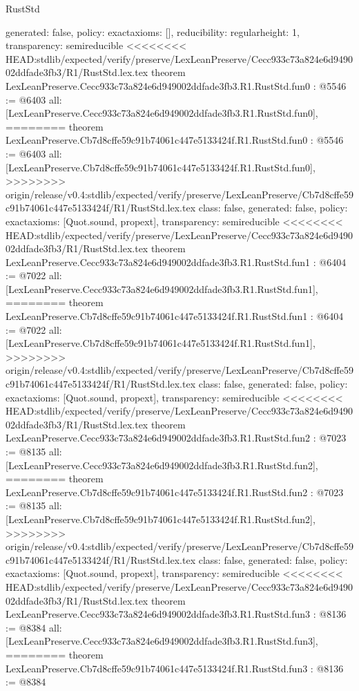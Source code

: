 \begin{lexlean}{RustStd}
\begin{coremodule}
{\begin{coremodule}
{{{  generated: false,
  policy: exact{axioms: []},
  reducibility: regular{height: 1},
  transparency: semireducible
}
<<<<<<<< HEAD:stdlib/expected/verify/preserve/LexLeanPreserve/Cecc933c73a824e6d949002ddfade3fb3/R1/RustStd.lex.tex
theorem LexLeanPreserve.Cecc933c73a824e6d949002ddfade3fb3.R1.RustStd.fun0 : @5546 := @6403 {
  all: [LexLeanPreserve.Cecc933c73a824e6d949002ddfade3fb3.R1.RustStd.fun0],
========
theorem LexLeanPreserve.Cb7d8cffe59c91b74061c447e5133424f.R1.RustStd.fun0 : @5546 := @6403 {
  all: [LexLeanPreserve.Cb7d8cffe59c91b74061c447e5133424f.R1.RustStd.fun0],
>>>>>>>> origin/release/v0.4:stdlib/expected/verify/preserve/LexLeanPreserve/Cb7d8cffe59c91b74061c447e5133424f/R1/RustStd.lex.tex
  class: false,
  generated: false,
  policy: exact{axioms: [Quot.sound, propext]},
  transparency: semireducible
}
<<<<<<<< HEAD:stdlib/expected/verify/preserve/LexLeanPreserve/Cecc933c73a824e6d949002ddfade3fb3/R1/RustStd.lex.tex
theorem LexLeanPreserve.Cecc933c73a824e6d949002ddfade3fb3.R1.RustStd.fun1 : @6404 := @7022 {
  all: [LexLeanPreserve.Cecc933c73a824e6d949002ddfade3fb3.R1.RustStd.fun1],
========
theorem LexLeanPreserve.Cb7d8cffe59c91b74061c447e5133424f.R1.RustStd.fun1 : @6404 := @7022 {
  all: [LexLeanPreserve.Cb7d8cffe59c91b74061c447e5133424f.R1.RustStd.fun1],
>>>>>>>> origin/release/v0.4:stdlib/expected/verify/preserve/LexLeanPreserve/Cb7d8cffe59c91b74061c447e5133424f/R1/RustStd.lex.tex
  class: false,
  generated: false,
  policy: exact{axioms: [Quot.sound, propext]},
  transparency: semireducible
}
<<<<<<<< HEAD:stdlib/expected/verify/preserve/LexLeanPreserve/Cecc933c73a824e6d949002ddfade3fb3/R1/RustStd.lex.tex
theorem LexLeanPreserve.Cecc933c73a824e6d949002ddfade3fb3.R1.RustStd.fun2 : @7023 := @8135 {
  all: [LexLeanPreserve.Cecc933c73a824e6d949002ddfade3fb3.R1.RustStd.fun2],
========
theorem LexLeanPreserve.Cb7d8cffe59c91b74061c447e5133424f.R1.RustStd.fun2 : @7023 := @8135 {
  all: [LexLeanPreserve.Cb7d8cffe59c91b74061c447e5133424f.R1.RustStd.fun2],
>>>>>>>> origin/release/v0.4:stdlib/expected/verify/preserve/LexLeanPreserve/Cb7d8cffe59c91b74061c447e5133424f/R1/RustStd.lex.tex
  class: false,
  generated: false,
  policy: exact{axioms: [Quot.sound, propext]},
  transparency: semireducible
}
<<<<<<<< HEAD:stdlib/expected/verify/preserve/LexLeanPreserve/Cecc933c73a824e6d949002ddfade3fb3/R1/RustStd.lex.tex
theorem LexLeanPreserve.Cecc933c73a824e6d949002ddfade3fb3.R1.RustStd.fun3 : @8136 := @8384 {
  all: [LexLeanPreserve.Cecc933c73a824e6d949002ddfade3fb3.R1.RustStd.fun3],
========
theorem LexLeanPreserve.Cb7d8cffe59c91b74061c447e5133424f.R1.RustStd.fun3 : @8136 := @8384 {
}}}}}}}
\end{coremodule}}
\end{coremodule}
\end{lexlean}
